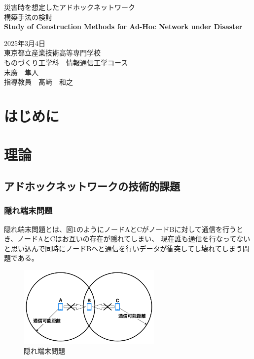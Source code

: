 \documentclass[a4paper, 11pt]{ltjsarticle}
\begin{document}
\thispagestyle{empty}
\begin{center}

\vspace*{40mm}
{\huge\noindent 災害時を想定したアドホックネットワーク}\\
\medskip
{\huge\noindent 構築手法の検討}\\
\vspace{\baselineskip}
{\huge\noindent\textbf{Study of Construction Methods for Ad-Hoc Network under Disaster}}\\
\vspace{120mm}

{\huge\noindent
2025年3月4日\\
東京都立産業技術高等専門学校\\
ものづくり工学科　情報通信工学コース \\
末廣　隼人\\
指導教員　髙﨑　和之    \\
}
\vspace{40mm}

\end{center}

\newpage
\thispagestyle{empty}
\tableofcontents  %

\newpage
{}
\section{はじめに}


\newpage  %
\section{理論}
\subsection{アドホックネットワークの技術的課題}
\subsubsection{隠れ端末問題}
隠れ端末問題とは、図1のようにノードAとCがノードBに対して通信を行うとき、ノードAとCはお互いの存在が隠れてしまい、
現在誰も通信を行なってないと思い込んで同時にノードBへと通信を行いデータが衝突してし壊れてしまう問題である。%
\begin{figure}[H]
  \centering
  \includegraphics[width=70mm]{hidden_terminal_problem.png}
  \caption{隠れ端末問題}
\end{figure}
\end{document}
